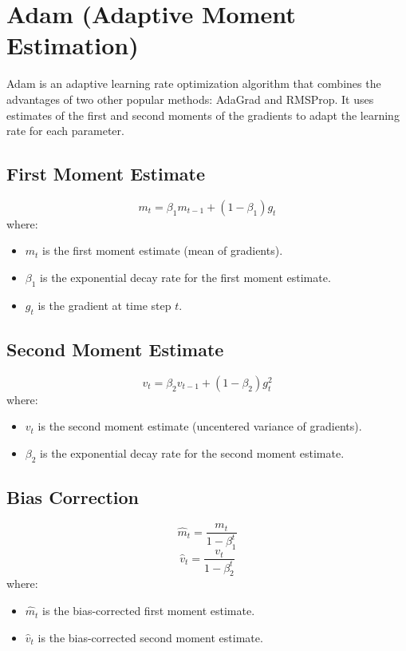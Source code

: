 \documentclass{article}
\begin{document}
\section{Adam (Adaptive Moment Estimation)}

Adam is an adaptive learning rate optimization algorithm that combines the advantages of two other popular methods: AdaGrad and RMSProp. It uses estimates of the first and second moments of the gradients to adapt the learning rate for each parameter.

\subsection{First Moment Estimate}
\begin{equation}
m_t = \beta_1 m_{t-1} + (1 - \beta_1) g_t
\end{equation}
where:
\begin{itemize}
    \item $m_t$ is the first moment estimate (mean of gradients).
    \item $\beta_1$ is the exponential decay rate for the first moment estimate.
    \item $g_t$ is the gradient at time step $t$.
\end{itemize}

\subsection{Second Moment Estimate}
\begin{equation}
v_t = \beta_2 v_{t-1} + (1 - \beta_2) g_t^2
\end{equation}
where:
\begin{itemize}
    \item $v_t$ is the second moment estimate (uncentered variance of gradients).
    \item $\beta_2$ is the exponential decay rate for the second moment estimate.
\end{itemize}

\subsection{Bias Correction}
\begin{equation}
\hat{m}_t = \frac{m_t}{1 - \beta_1^t}
\end{equation}
\begin{equation}
\hat{v}_t = \frac{v_t}{1 - \beta_2^t}
\end{equation}
where:
\begin{itemize}
    \item $\hat{m}_t$ is the bias-corrected first moment estimate.
    \item $\hat{v}_t$ is the bias-corrected second moment estimate.
\end{itemize}
\end{document}
